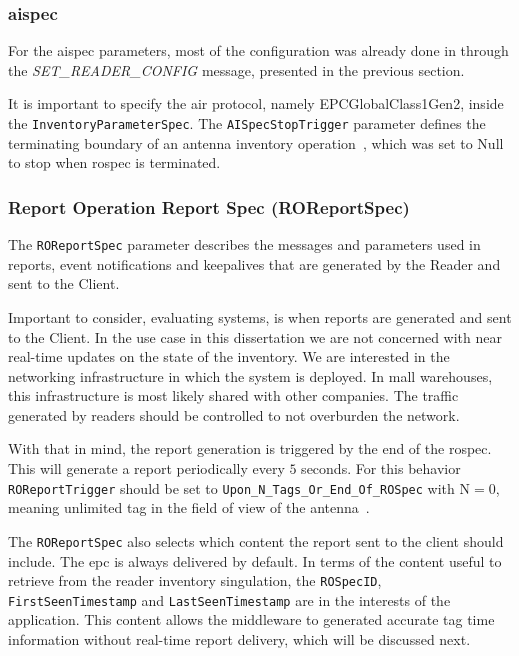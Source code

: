 \subsubsection{\acl{aispec}}

For the \ac{aispec} parameters, most of the configuration was already done in through the \textit{SET\_READER\_CONFIG} message, presented in the previous section.

It is important to specify the air protocol, namely EPCGlobalClass1Gen2, inside the \texttt{InventoryParameterSpec}.
The \texttt{AISpecStopTrigger} parameter defines the terminating boundary of an antenna inventory operation~\cite{LowLevelReader}, which was set to Null to stop when \ac{rospec} is terminated.

\subsubsection{Report Operation Report Spec (ROReportSpec)}

The \texttt{ROReportSpec} parameter describes the messages and parameters used in reports, event notifications and keepalives that are generated by the Reader and sent to the Client.

Important to consider, evaluating systems, is when reports are generated and sent to the Client. 
In the use case in this dissertation we are not concerned with near real-time updates on the state of the inventory. We are interested in the networking infrastructure in which the system is deployed. In mall warehouses, this infrastructure is most likely shared with other companies. The traffic generated by readers should be controlled to not overburden the network.

With that in mind, the report generation is triggered by the end of the \ac{rospec}. This will generate a report periodically every $5$ seconds.
For this behavior \texttt{ROReportTrigger} should be set to \texttt{Upon\_N\_Tags\_Or\_End\_Of\_ROSpec} with N$=0$, meaning unlimited tag in the field of view of the antenna~\cite{LowLevelReader}.

The \texttt{ROReportSpec} also selects which content the report sent to the client should include.
The \ac{epc} is always delivered by default.
In terms of the content useful to retrieve from the reader inventory singulation, the \texttt{ROSpecID}, \texttt{FirstSeenTimestamp} and \texttt{LastSeenTimestamp} are in the interests of the application. 
This content allows the middleware to generated accurate tag time information without real-time report delivery, which will be discussed next.

